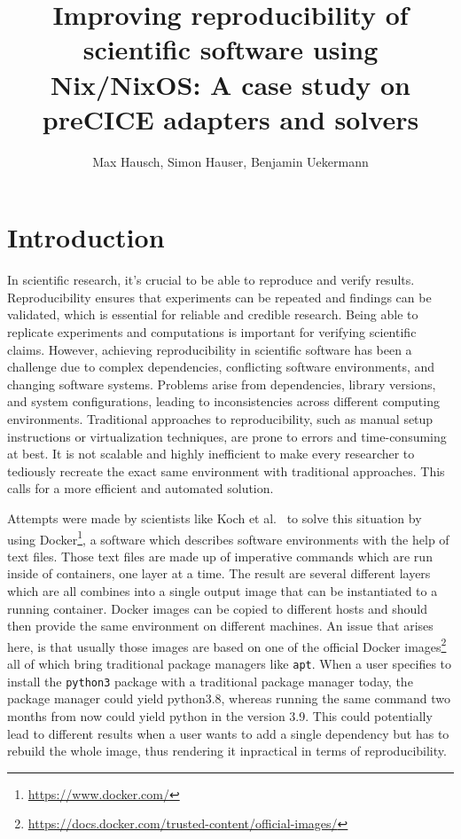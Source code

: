 \documentclass{eceasst}
\title{Improving reproducibility of scientific software using Nix/NixOS: A case study on preCICE adapters and solvers}
\author{
Max Hausch\autref{1+},
Simon Hauser\autref{2+},
Benjamin Uekermann\autref{3}}
\institute{
\autlabel{1} \email{st175425@stud.uni-stuttgart.de}\\
\autlabel{2} \email{st148883@stud.uni-stuttgart.de}\\
\autlabel{3} \email{Benjamin.Uekermann@ipvs.uni-stuttgart.de}\\
\autlabel{+} These authors contributed equally to this work.}
\begin{document}
\maketitle

\section{Introduction}

In scientific research, it's crucial to be able to reproduce and verify results.
Reproducibility ensures that experiments can be repeated and findings can be validated, which is essential for reliable and credible research.
Being able to replicate experiments and computations is important for verifying scientific claims.
However, achieving reproducibility in scientific software has been a challenge due to complex dependencies, conflicting software environments, and changing software systems.
Problems arise from dependencies, library versions, and system configurations, leading to inconsistencies across different computing environments.
Traditional approaches to reproducibility, such as manual setup instructions or virtualization techniques, are prone to errors and time-consuming at best.
It is not scalable and highly inefficient to make every researcher to tediously recreate the exact same environment with traditional approaches.
This calls for a more efficient and automated solution.

Attempts were made by scientists like Koch et al.~\cite{koch2023sustainable} to solve this situation by using Docker\footnote{\url{https://www.docker.com/}}, a software which describes software environments with the help of text files.
Those text files are made up of imperative commands which are run inside of containers, one layer at a time.
The result are several different layers which are all combines into a single output image that can be instantiated to a running container.
Docker images can be copied to different hosts and should then provide the same environment on different machines.
An issue that arises here, is that usually those images are based on one of the official Docker images\footnote{\url{https://docs.docker.com/trusted-content/official-images/}} all of which bring traditional package managers like \texttt{apt}.
When a user specifies to install the \texttt{python3} package with a traditional package manager today, the package manager could yield python3.8, whereas running the same command two months from now could yield python in the version 3.9.
This could potentially lead to different results when a user wants to add a single dependency but has to rebuild the whole image, thus rendering it inpractical in terms of reproducibility.
\end{document}
